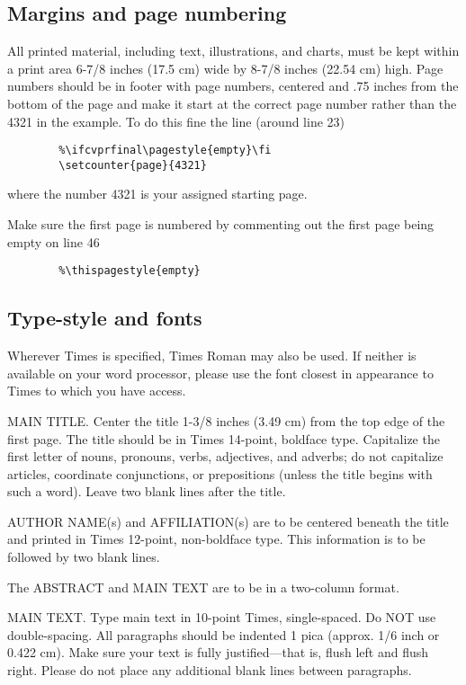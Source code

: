 \documentclass[10pt,twocolumn,letterpaper]{article}
\begin{document}
	\subsection{Margins and page numbering}
	
	All printed material, including text, illustrations, and charts, must be kept
	within a print area 6-7/8 inches (17.5 cm) wide by 8-7/8 inches (22.54 cm)
	high.
	Page numbers should be in footer with page numbers, centered and .75
	inches from the bottom of the page and make it start at the correct page
	number rather than the 4321 in the example.  To do this fine the line (around
	line 23)  
	\begin{verbatim}
		%\ifcvprfinal\pagestyle{empty}\fi
		\setcounter{page}{4321}
	\end{verbatim}
	where the number 4321 is your assigned starting page.  
	
	Make sure the first page is numbered by commenting out the first page being
	empty on line 46
	\begin{verbatim}
		%\thispagestyle{empty}
	\end{verbatim}
	
	
	\subsection{Type-style and fonts}
	
	Wherever Times is specified, Times Roman may also be used. If neither is
	available on your word processor, please use the font closest in
	appearance to Times to which you have access.
	
	MAIN TITLE. Center the title 1-3/8 inches (3.49 cm) from the top edge of
	the first page. The title should be in Times 14-point, boldface type.
	Capitalize the first letter of nouns, pronouns, verbs, adjectives, and
	adverbs; do not capitalize articles, coordinate conjunctions, or
	prepositions (unless the title begins with such a word). Leave two blank
	lines after the title.
	
	AUTHOR NAME(s) and AFFILIATION(s) are to be centered beneath the title
	and printed in Times 12-point, non-boldface type. This information is to
	be followed by two blank lines.
	
	The ABSTRACT and MAIN TEXT are to be in a two-column format.
	
	MAIN TEXT. Type main text in 10-point Times, single-spaced. Do NOT use
	double-spacing. All paragraphs should be indented 1 pica (approx. 1/6
	inch or 0.422 cm). Make sure your text is fully justified---that is,
	flush left and flush right. Please do not place any additional blank
	lines between paragraphs.
	
\end{document}
